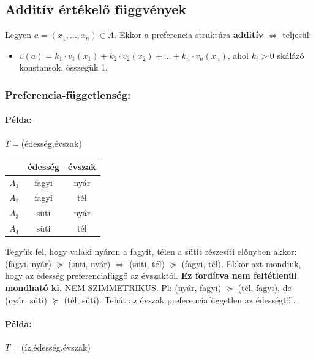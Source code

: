 \documentclass[a4paper,12pt]{article}
\begin{document}
\subsection{Additív értékelő függvények}

Legyen $a=(x_1, ... , x_n) \in A$. Ekkor a preferencia struktúra \textbf{additív} $\Leftrightarrow$ teljesül:
\begin{itemize}
\item $v(a) = k_1 \cdot v_1(x_1) + k_2 \cdot v_2(x_2) + ... + k_n \cdot v_n(x_n)$, ahol $k_i > 0$ skálázó konstansok, összegük 1.
\end{itemize}

\subsubsection{Preferencia-függetlenség: }

\paragraph{Példa:}  $T=$(édesség,évszak)

\begin{center}
\begin{tabular}{c||c|c}
 & édesség& évszak \\
 \hline
 $A_1$& fagyi & nyár \\
 $A_2$& fagyi & tél \\
 $A_3$& süti & nyár \\
 $A_4$& süti & tél \\
\end{tabular}
\end{center}

Tegyük fel, hogy valaki nyáron a fagyit, télen a sütit részesíti előnyben akkor: (fagyi, nyár) $\succeq$ (süti, nyár) 
$\Rightarrow$
(süti, tél) $\succeq$ (fagyi, tél). Ekkor azt mondjuk, hogy az édesség preferenciafüggő az évszaktól. \textbf{Ez fordítva nem feltétlenül mondható ki.} NEM SZIMMETRIKUS. Pl: (nyár, fagyi) $\succeq$ (tél, fagyi), de (nyár, süti) $\succeq$ (tél, süti). Tehát az évszak preferenciafüggetlen az édességtől.


\paragraph{Példa:}  $T=$(íz,édesség,évszak)
\end{document}
